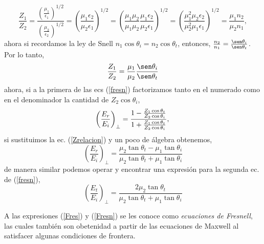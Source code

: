 \documentclass[11pt,fleqn]{book} %
\begin{document}
\begin{equation*}
\frac{Z_1}{Z_2}=\frac{\left( \frac{\mu_1}{\epsilon_1} \right)^{1/2}}{\left( \frac{\mu_2}{\epsilon_2} \right)^{1/2}}=\left(\frac{\mu_1\epsilon_2}{\mu_2\epsilon_1}\right)^{1/2}=\left(\frac{\mu_1\mu_2}{\mu_1\mu_2}\frac{\mu_1\epsilon_2}{\mu_2\epsilon_1}\right)^{1/2}=\left(\frac{\mu_1^2\mu_2\epsilon_2}{\mu_2^2\mu_1\epsilon_1}\right)^{1/2}=\frac{\mu_1 n_2}{\mu_2 n_1},
\end{equation*}
ahora si recordamos la ley de Snell $n_1\cos \theta_i=n_2\cos\theta_t$, entonces, $\frac{n_2}{n_1}=\frac{\sen\theta_i}{\sen\theta_t}$. Por lo tanto,
\begin{equation}  \label{Zrelacion}
\frac{Z_1}{Z_2}=\frac{\mu_1}{\mu_2}\frac{\sen\theta_i}{\sen\theta_t}
\end{equation}
ahora, si a la primera de las ecs (\ref{fresn}) factorizamos tanto en el numerado como en el denominador la cantidad de $Z_2\cos\theta_i$,
\begin{equation*}
\left(\frac{E_r}{E_i}\right)_{\perp}=\frac{1- \frac{Z_1\cos\theta_t}{Z_2\cos\theta_i} }{1+ \frac{Z_1\cos\theta_t}{Z_2\cos\theta_i} },\\
\end{equation*}
si sustituimos la ec. (\ref{Zrelacion}) y un poco de \'algebra obtenemos,
\begin{equation} \label{Fres}
\left(\frac{E_r}{E_i}\right)_{\perp}=\frac{\mu_2\tan \theta_t-\mu_1\tan\theta_i}{\mu_2\tan \theta_t+\mu_1\tan\theta_i}
\end{equation}
de manera similar podemos operar y encontrar una expresi\'on para la segunda ec. de (\ref{fresn}),
\begin{equation}  \label{Fresn}
\left(\frac{E_t}{E_i}\right)_{\perp}=\frac{2\mu_2\tan \theta_t}{\mu_2\tan \theta_t+\mu_1\tan\theta_i}
\end{equation}


A las expresiones (\ref{Fres}) y (\ref{Fresn}) se les conoce como \textit{ecuaciones de Fresnell}, las cuales tambi\'en son obetenidad a partir de las ecuaciones de Maxwell al satisfacer algunas condiciones de frontera.\\
\end{document}
